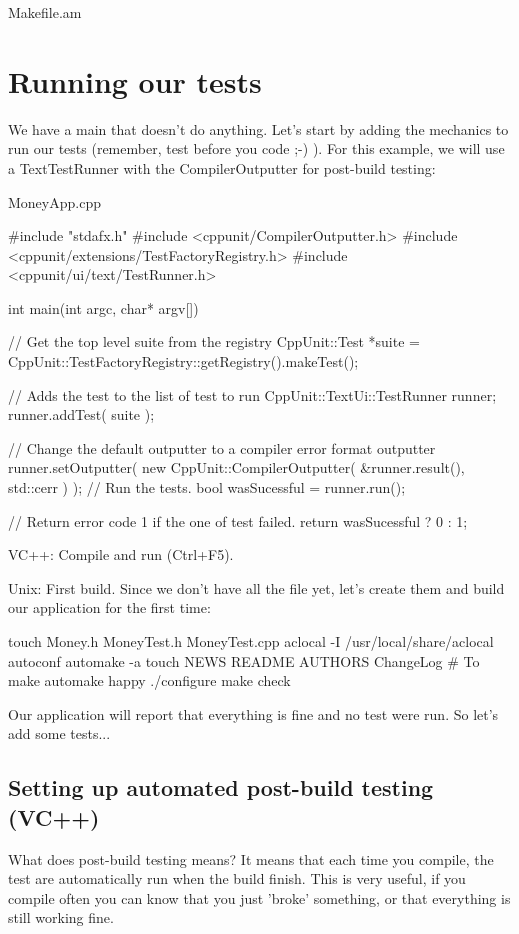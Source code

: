 {\ttfamily Makefile.am} 
\hypertarget{money_example_sec_running_test}{}\section{Running our tests}\label{money_example_sec_running_test}
We have a main that doesn't do anything. Let's start by adding the mechanics to run our tests (remember, test before you code ;-\/) ). For this example, we will use a TextTestRunner with the CompilerOutputter for post-\/build testing:

{\ttfamily MoneyApp.cpp} 
\begin{DoxyCode}
#include "stdafx.h"
#include <cppunit/CompilerOutputter.h>
#include <cppunit/extensions/TestFactoryRegistry.h>
#include <cppunit/ui/text/TestRunner.h>


int main(int argc, char* argv[])
{
  // Get the top level suite from the registry
  CppUnit::Test *suite = CppUnit::TestFactoryRegistry::getRegistry().makeTest();

  // Adds the test to the list of test to run
  CppUnit::TextUi::TestRunner runner;
  runner.addTest( suite );

  // Change the default outputter to a compiler error format outputter
  runner.setOutputter( new CppUnit::CompilerOutputter( &runner.result(),
                                                       std::cerr ) );
  // Run the tests.
  bool wasSucessful = runner.run();

  // Return error code 1 if the one of test failed.
  return wasSucessful ? 0 : 1;
}
\end{DoxyCode}


VC++: Compile and run (Ctrl+F5).

Unix: First build. Since we don't have all the file yet, let's create them and build our application for the first time: \begin{DoxyVerb}
touch Money.h MoneyTest.h MoneyTest.cpp
aclocal -I /usr/local/share/aclocal
autoconf
automake -a
touch NEWS README AUTHORS ChangeLog # To make automake happy
./configure
make check\end{DoxyVerb}


Our application will report that everything is fine and no test were run. So let's add some tests...\hypertarget{money_example_sec_post_build}{}\subsection{Setting up automated post-\/build testing (VC++)}\label{money_example_sec_post_build}
What does post-\/build testing means? It means that each time you compile, the test are automatically run when the build finish. This is very useful, if you compile often you can know that you just 'broke' something, or that everything is still working fine.


